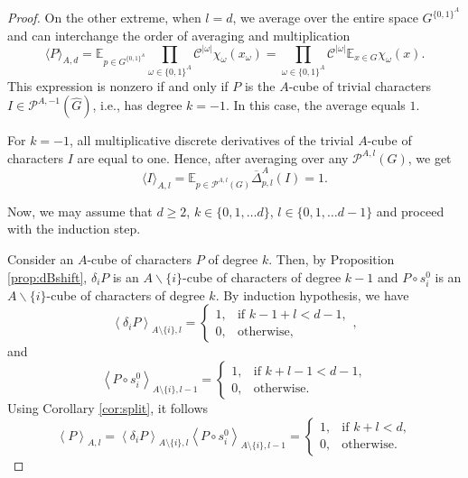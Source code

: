 \documentclass[10pt,a4paper]{amsart}
\begin{document}
\begin{proof}
On the other extreme, when $l=d$, we average over the entire space ${G}^{{\{0,1\}}^A}$ and can interchange the order of averaging and multiplication  
$$\langle P \rangle_{A,d} =
 \mathbb{E}_{p \in {G}^{{\{0,1\}}^A}}\prod_{\omega \in \{0,1\}^A} \mathcal{C}^{|\omega|} \chi_\omega (x_\omega) = 
\prod_{\omega \in \{0,1\}^A} \mathcal{C}^{|\omega|} \mathbb{E}_{x \in G}\chi_\omega (x).$$ 
This expression is nonzero if and only if $P$ is the $A$-cube of trivial characters  $I \in \mathcal{P}^{A,-1}(\widehat{G})$, i.e., has degree $k=-1$. In this case, the average equals $1$.

For $k=-1$, all multiplicative discrete derivatives of the trivial $A$-cube of characters $I$ are equal to one. Hence, after averaging over any $\mathcal{P}^{A,l}(G)$, we get  
$$\langle I \rangle_{A,l} = \mathbb{E}_{p \in  \mathcal{P}^{A,l}(G)} \overline{\Delta}^A_{p,l} (I) = 1.$$

Now, we may assume that $d\ge 2$, $k\in \{0,1, \dots d\} $,  $l\in \{0,1, \dots d-1\}$ and proceed with the induction step. 

Consider an $A$-cube of characters $P$ of degree $k$. Then, by Proposition \ref{prop:dBshift}, $\delta_i P$ is an $A\backslash  \{i\}$-cube of characters of degree $k-1$ and $ P \circ s_i^0$ is an $A\backslash \{i\}$-cube of characters of degree $k$. By induction hypothesis, we have
$$\left\langle \delta_i P \right\rangle_{A\setminus \{i\},l} = \begin{cases} 1, & \text{if } k-1 +l  < d -1, \\ 0, & \text{otherwise,} \end{cases},$$
and
$$\left\langle P \circ s_i^0 \right\rangle_{A\setminus \{i\},l-1} = \begin{cases} 1, & \text{if } k +l -1 < d -1, \\ 0, & \text{otherwise.} \end{cases}$$
Using Corollary \ref{cor:split}, it follows 
$$ \left\langle P \right\rangle_{A,l}  = 
\left\langle \delta_i P \right\rangle_{A\setminus \{i\},l} 
\left\langle P \circ s_i^0 \right\rangle_{A \setminus \{i\},l-1} =\begin{cases} 1, & \text{if } k + l  < d, \\ 0, & \text{otherwise.} \end{cases}
$$
\end{proof}
\end{document}
